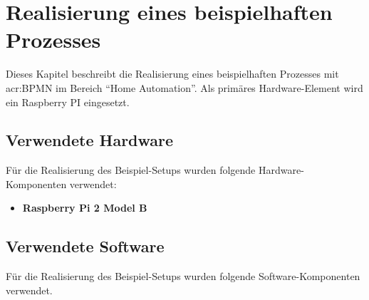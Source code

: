 
\chapter{Realisierung eines beispielhaften Prozesses}\label{sec:AnalyseRPI:Beispiel}
Dieses Kapitel beschreibt die Realisierung eines beispielhaften Prozesses mit \gls{acr:BPMN} im Bereich "`Home Automation"'. Als primäres Hardware-Element wird ein Raspberry PI eingesetzt.

\section{Verwendete Hardware}
Für die Realisierung des Beispiel-Setups wurden folgende Hardware-Komponenten verwendet:
\begin{itemize}
\item \textbf{Raspberry Pi 2 Model B}
\end{itemize}

\section{Verwendete Software} \label{sec:AnalyseRPI:Beispiel:SW}
Für die Realisierung des Beispiel-Setups wurden folgende Software-Komponenten verwendet.

